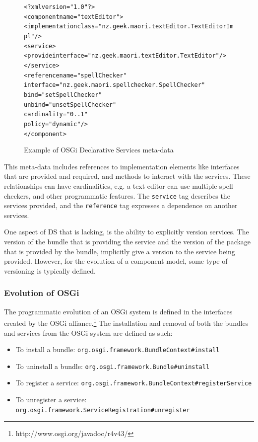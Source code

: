 \begin{figure}[htp]
\begin{center}
\begin{alltt}
<?xml version="1.0"?>
<component name="textEditor">
    <implementation class="nz.geek.maori.textEditor.TextEditorImpl"/>
    <service>
        <provide interface="nz.geek.maori.textEditor.TextEditor"/>
    </service>
    <reference name="spellChecker"
        interface="nz.geek.maori.spellchecker.SpellChecker"
        bind="setSpellChecker"
        unbind="unsetSpellChecker"
        cardinality="0..1"
        policy="dynamic"/>
</component>
\end{alltt}
  \caption[OSGi Declarative Services]{Example of OSGi Declarative Services meta-data}
  \label{dsmetadata}
\end{center}
\end{figure}

This meta-data includes references to implementation elements like interfaces that are provided and required, and methods to interact with the services.
These relationships can have cardinalities, e.g. a text editor can use multiple spell checkers, and other programmatic features.
The \verb+service+ tag describes the services provided, and the \verb+reference+ tag expresses a dependence on another services.

One aspect of DS that is lacking, is the ability to explicitly version services.
The version of the bundle that is providing the service and the version of the package that is provided by the bundle, implicitly give a version to the service being provided.
However, for the evolution of a component model, some type of versioning is typically defined.

\subsubsection{Evolution of OSGi}
The programmatic evolution of an OSGi system is defined in the interfaces created by the OSGi alliance.\footnote{http://www.osgi.org/javadoc/r4v43/}
The installation and removal of both the bundles and services from the OSGi system are defined as such:
 
\begin{itemize}
  \item To install a bundle: \verb+org.osgi.framework.BundleContext#install+
  \item To uninstall a bundle: \verb+org.osgi.framework.Bundle#uninstall+
  \item To register a service: \verb+org.osgi.framework.BundleContext#registerService+
  \item To unregister a service: \verb+org.osgi.framework.ServiceRegistration#unregister+
\end{itemize}

